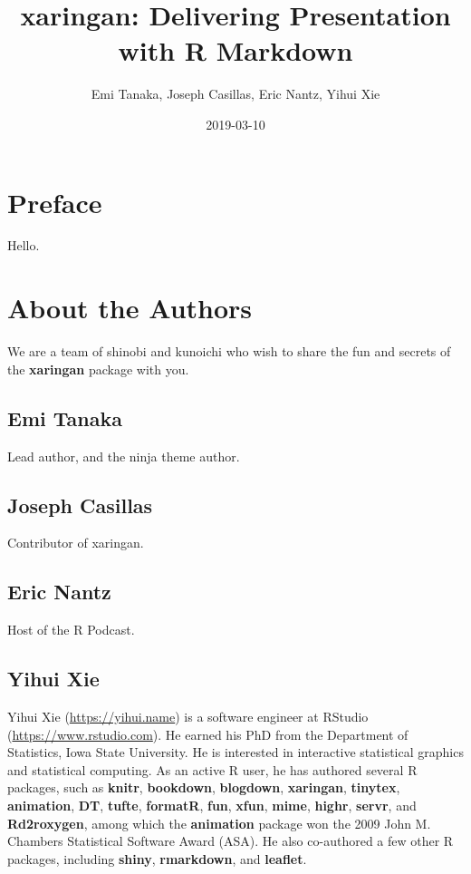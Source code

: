 \documentclass[
]{book}
\title{xaringan: Delivering Presentation with R Markdown}
\author{Emi Tanaka, Joseph Casillas, Eric Nantz, Yihui Xie}
\date{2019-03-10}
\begin{document}
\maketitle

{
\setcounter{tocdepth}{2}
\tableofcontents
}
\hypertarget{preface}{%
\chapter*{Preface}\label{preface}}


Hello.

\hypertarget{author}{%
\chapter*{About the Authors}\label{author}}


We are a team of shinobi and kunoichi who wish to share the fun and secrets of the \textbf{xaringan} package with you.

\hypertarget{emi-tanaka}{%
\section*{Emi Tanaka}\label{emi-tanaka}}


Lead author, and the ninja theme author.

\hypertarget{joseph-casillas}{%
\section*{Joseph Casillas}\label{joseph-casillas}}


Contributor of xaringan.

\hypertarget{eric-nantz}{%
\section*{Eric Nantz}\label{eric-nantz}}


Host of the R Podcast.

\hypertarget{yihui-xie}{%
\section*{Yihui Xie}\label{yihui-xie}}


Yihui Xie (\url{https://yihui.name}) is a software engineer at RStudio (\url{https://www.rstudio.com}). He earned his PhD from the Department of Statistics, Iowa State University. He is interested in interactive statistical graphics and statistical computing. As an active R user, he has authored several R packages, such as \textbf{knitr}, \textbf{bookdown}, \textbf{blogdown}, \textbf{xaringan}, \textbf{tinytex}, \textbf{animation}, \textbf{DT}, \textbf{tufte}, \textbf{formatR}, \textbf{fun}, \textbf{xfun}, \textbf{mime}, \textbf{highr}, \textbf{servr}, and \textbf{Rd2roxygen}, among which the \textbf{animation} package won the 2009 John M. Chambers Statistical Software Award (ASA). He also co-authored a few other R packages, including \textbf{shiny}, \textbf{rmarkdown}, and \textbf{leaflet}.
\end{document}

